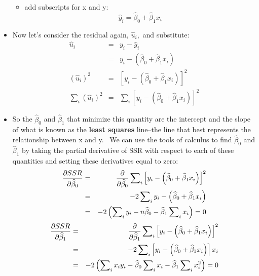 \documentclass[11pt]{article}
\begin{document}
\begin{itemize}
\begin{itemize}
\item add subscripts for x and y:%
\begin{equation*}
\widehat{y}_{i}=\widehat{\beta }_{0}+\widehat{\beta }_{1}x_{i}
\end{equation*}
\end{itemize}

\item Now let's consider the residual again, $\widehat{u}_{i},$ and
substitute:%
\begin{eqnarray*}
\widehat{u}_{i} &=&y_{i}-\widehat{y}_{i} \\
&=&y_{i}-\left( \widehat{\beta }_{0}+\widehat{\beta }_{1}x_{i}\right) \\
\left( \widehat{u}_{i}\right) ^{2} &=&\left[ y_{i}-\left( \widehat{\beta }%
_{0}+\widehat{\beta }_{1}x_{i}\right) \right] ^{2} \\
\sum\nolimits_{i}\left( \widehat{u}_{i}\right) ^{2} &=&\sum\nolimits_{i}%
\left[ y_{i}-\left( \widehat{\beta }_{0}+\widehat{\beta }_{1}x_{i}\right) %
\right] ^{2}
\end{eqnarray*}

\item So the $\widehat{\beta }_{0}$ and $\widehat{\beta }_{1}$ that minimize
this quantity are the intercept and the slope of what is known as the 
\textbf{least squares }line--the line that best represents the relationship
between x and y. \ We can use the tools of calculus to find $\widehat{\beta }%
_{0}$ and $\widehat{\beta }_{1}$ by taking the partial derivative of SSR
with respect to each of these quantities and setting these derivatives equal
to zero:%
\begin{eqnarray*}
\frac{\partial SSR}{\partial \widehat{\beta }_{0}} &=&\frac{\partial }{%
\partial \widehat{\beta }_{0}}\sum\nolimits_{i}\left[ y_{i}-\left( \widehat{%
\beta }_{0}+\widehat{\beta }_{1}x_{i}\right) \right] ^{2} \\
&=&-2\sum\nolimits_{i}y_{i}-\left( \widehat{\beta }_{0}+\widehat{\beta }%
_{1}x_{i}\right) \\
&=&-2\left( \sum\nolimits_{i}y_{i}-n\widehat{\beta }_{0}-\widehat{\beta }%
_{1}\sum\nolimits_{i}x_{i}\right) =0
\end{eqnarray*}%
\begin{eqnarray*}
\frac{\partial SSR}{\partial \widehat{\beta }_{1}} &=&\frac{\partial }{%
\partial \widehat{\beta }_{1}}\sum\nolimits_{i}\left[ y_{i}-\left( \widehat{%
\beta }_{0}+\widehat{\beta }_{1}x_{i}\right) \right] ^{2} \\
&=&-2\sum\nolimits_{i}\left[ y_{i}-\left( \widehat{\beta }_{0}+\widehat{%
\beta }_{1}x_{i}\right) \right] x_{i} \\
&=&-2\left( \sum\nolimits_{i}x_{i}y_{i}-\widehat{\beta }_{0}\sum%
\nolimits_{i}x_{i}-\widehat{\beta }_{1}\sum\nolimits_{i}x_{i}^{2}\right) =0
\end{eqnarray*}


\end{itemize}
\end{document}
